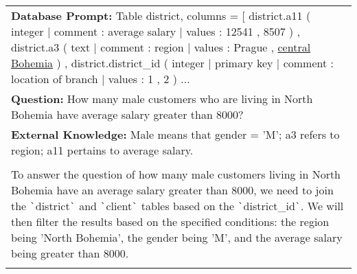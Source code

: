 \begin{table*}[htbp]
\centering
\begin{tcolorbox}[
    colback=white, %
    colframe=black, %
    title=Response, %
    fonttitle=\bfseries, %
    width=\textwidth, %
    boxrule=1pt, %
    rounded corners, %
]

\begin{tabularx}{\textwidth}{X}
\textbf{Database Prompt:} Table district, columns = [ district.a11 ( integer | comment : average salary | values : 12541 , 8507 ) ,
district.a3 ( text | comment : region | values : Prague , \underline{central Bohemia} ) , district.district\_id ( integer | primary
key | comment : location of branch | values : 1 , 2 ) ... \\
\textbf{Question:} How many male customers who are living in North Bohemia have average salary greater than 8000? \\ 
\textbf{External Knowledge:} Male means that gender = 'M'; a3 refers to region; a11 pertains to average salary. \\
\hline
\\ %

To answer the question of how many male customers living in North Bohemia have an average salary greater than 8000, we need to join the \verb|`|district\verb|`| and \verb|`|client\verb|`| tables based on the \verb|`|district\_id\verb|`|. We will then filter the results based on the specified conditions: the region being 'North Bohemia', the gender being 'M', and the average salary being greater than 8000. \\ \\


\end{tabularx}
\end{tcolorbox}
\end{table*}
